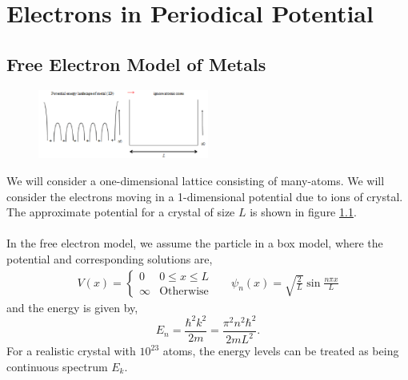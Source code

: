 \documentclass{book}
\begin{document}
\chapter{Electrons in Periodical Potential}
\section{Free Electron Model of Metals}
\begin{figure}[h]
	\centering
	\includegraphics[width=0.5\textwidth]{freeelectron.png}
	\caption{}
	\label{eq:free}
\end{figure}
We will consider a one-dimensional lattice consisting of many-atoms. We will consider the electrons moving in a 1-dimensional potential due to ions of crystal. The approximate potential for a crystal of size $L$ is shown in figure \ref{eq:free}. 
\\\\
In the free electron model, we assume the particle in a box model, where the potential and corresponding solutions are,
\begin{align}
	V(x) = \begin{cases}
		0 & 0 \leq x \leq L \\
		\infty & \text{Otherwise}
	\end{cases}
	&& \psi_n(x) = \sqrt{\frac{2}{L}}\sin\frac{n\pi x}{L}
\end{align}
and the energy is given by,
\begin{equation}
	E_n = \frac{\hbar^2k^2}{2m} = \frac{\pi^2n^2\hbar^2}{2mL^2}.
\end{equation}
For a realistic crystal with $10^23$ atoms, the energy levels can be treated as being continuous spectrum $E_k$. 
\end{document}
